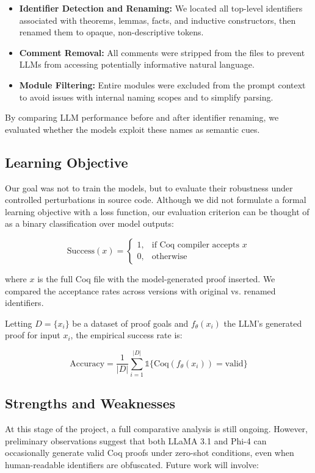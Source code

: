 \begin{itemize}
  \item \textbf{Identifier Detection and Renaming:} We located all top-level identifiers associated with theorems, lemmas, facts, and inductive constructors, then renamed them to opaque, non-descriptive tokens.
  \item \textbf{Comment Removal:} All comments were stripped from the files to prevent LLMs from accessing potentially informative natural language.
  \item \textbf{Module Filtering:} Entire modules were excluded from the prompt context to avoid issues with internal naming scopes and to simplify parsing.
\end{itemize}

By comparing LLM performance before and after identifier renaming, we evaluated whether the models exploit these names as semantic cues.

\subsection{Learning Objective}

Our goal was not to train the models, but to evaluate their robustness under controlled perturbations in source code. Although we did not formulate a formal learning objective with a loss function, our evaluation criterion can be thought of as a binary classification over model outputs:

\[
\text{Success}(x) =
\begin{cases}
1, & \text{if Coq compiler accepts } x \\
0, & \text{otherwise}
\end{cases}
\]

where \( x \) is the full Coq file with the model-generated proof inserted. We compared the acceptance rates across versions with original vs. renamed identifiers.

Letting \( D = \{x_i\} \) be a dataset of proof goals and \( f_\theta(x_i) \) the LLM's generated proof for input \( x_i \), the empirical success rate is:

\[
\text{Accuracy} = \frac{1}{|D|} \sum_{i=1}^{|D|} \mathbb{1}\{ \text{Coq}(f_\theta(x_i)) = \text{valid} \}
\]

\subsection{Strengths and Weaknesses}
At this stage of the project, a full comparative analysis is still ongoing. However, preliminary observations suggest that both LLaMA 3.1 and Phi-4 can occasionally generate valid Coq proofs under zero-shot conditions, even when human-readable identifiers are obfuscated. Future work will involve:

